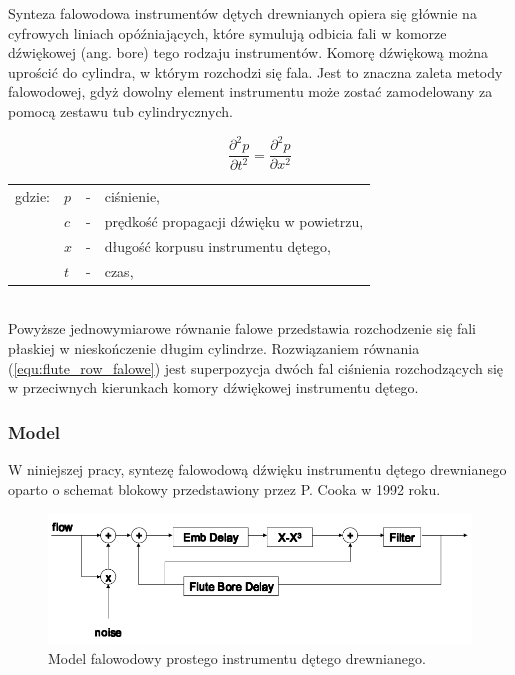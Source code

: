 Synteza falowodowa instrumentów dętych drewnianych opiera się głównie na cyfrowych liniach opóźniających, które symulują odbicia fali w komorze dźwiękowej (ang. bore) tego rodzaju instrumentów. Komorę dźwiękową można uprościć do cylindra, w którym rozchodzi się fala. Jest to znaczna zaleta metody falowodowej, gdyż dowolny element instrumentu może zostać zamodelowany za pomocą zestawu tub cylindrycznych.

\begin{equation} \label{equ:flute_row_falowe}
\frac{\partial^2 p}{\partial t^2} = \frac{\partial^2 p}{\partial x^2}
\end{equation}
\begin{tabular}{ l l l l}
	gdzie: 	&	$p$ & - &  ciśnienie, \\
	& $c$ &  - & prędkość propagacji dźwięku w powietrzu, \\
	&	$x$ & - &  długość korpusu instrumentu dętego,\\
	&	$t$ & - &  czas, \\
\end{tabular} \\

Powyższe jednowymiarowe równanie falowe przedstawia rozchodzenie się fali płaskiej w nieskończenie długim cylindrze. Rozwiązaniem równania (\ref{equ:flute_row_falowe}) jest superpozycja dwóch fal ciśnienia rozchodzących się w przeciwnych kierunkach komory dźwiękowej instrumentu dętego.


\subsubsection{Model}
W niniejszej pracy, syntezę falowodową dźwięku instrumentu dętego drewnianego oparto o schemat blokowy przedstawiony przez P. Cooka w 1992 roku.

\begin{figure}[H]
	\centering
	\includegraphics[width=14cm]{grafiki/flute_waveguide_mod}
	\captionsetup{justification=centering}
	\caption{Model falowodowy prostego instrumentu dętego drewnianego.}
	\label{rys:flute_cook}
\end{figure}

